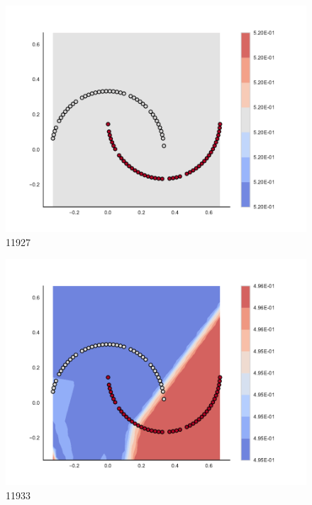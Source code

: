 \begin{subfigure}[b]{0.09\textwidth}
    \includegraphics[clip, trim=2.35cm 1.75cm 4.5cm 0cm,width=\textwidth]{img/convergence/11927.pdf}
    \caption{11927}
    \label{fig:convergence_11927}
\end{subfigure}
%
\begin{subfigure}[b]{0.09\textwidth}
    \includegraphics[clip, trim=2.35cm 1.75cm 4.5cm 0cm,width=\textwidth]{img/convergence/11933.pdf}
    \caption{11933}
    \label{fig:convergence_11933}
\end{subfigure}
%
